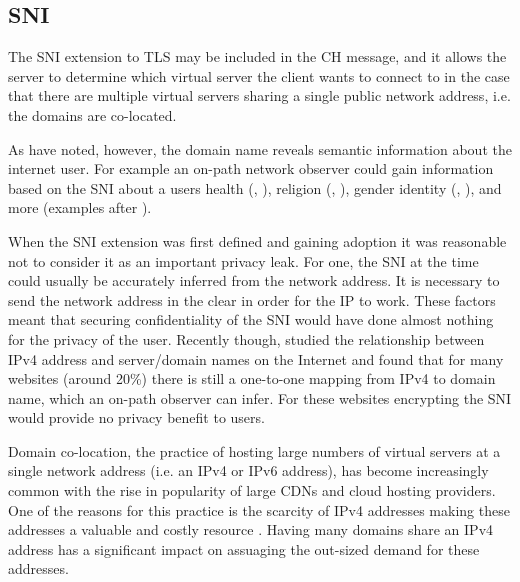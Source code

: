 \subsection{SNI}
The \ac{SNI} extension to \ac{TLS} may be included in the \ac{CH} message, and it allows the server to determine which virtual server the client wants to connect to in the case that there are multiple virtual servers sharing a single public network address, i.e. the domains are co-located.


As \cite{hoang-2020-assessing-privacy-benefits-sni-encryption} have noted, however, the domain name reveals semantic information about the internet user. For example an on-path network observer could gain information
based on the \ac{SNI}
about a users health (, ), religion (, ), gender identity (, ), and more (examples after \cite{hoang-2020-assessing-privacy-benefits-sni-encryption}).

When the \ac{SNI} extension was first defined and gaining adoption it was reasonable not to consider it as an important privacy leak.
For one, the \ac{SNI} at the time could usually be accurately inferred from the network address.
It is necessary to send the network address in the clear in order for the \ac{IP} to work.
These factors meant that securing confidentiality of the \ac{SNI} would have done almost nothing for the privacy of the user.
Recently though, \cite{hoang-2020-assessing-privacy-benefits-sni-encryption} studied the relationship between IPv4 address
and server/domain names on the Internet and found that for many websites
(around 20\%) there is still a one-to-one mapping from IPv4 to domain name,
which an on-path observer can infer.
For these websites encrypting the \ac{SNI} would provide no privacy benefit to users.

Domain co-location, the practice of hosting large numbers of virtual servers at a single network address (i.e. an IPv4 or IPv6 address), has become increasingly common with the rise in popularity of large \acp{CDN} and cloud hosting providers. One of the reasons for this practice is the scarcity of IPv4 addresses making these addresses a valuable and costly resource \citep{mueller2008scarcity}. Having many domains share an IPv4 address has a significant impact on assuaging the out-sized demand for these addresses.


